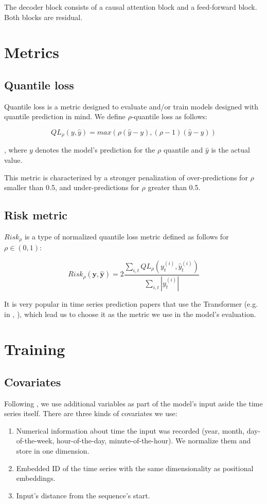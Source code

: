 \documentclass[en]{pracamgr}
\begin{document}
The decoder block consists of a causal attention block and a feed-forward block. Both blocks are residual.

\section{Metrics}

\subsection{Quantile loss}

Quantile loss is a metric designed to evaluate and/or train models designed with quantile prediction in mind.
We define $\rho$-quantile loss as follows:

$$ QL_\rho(y, \hat{y}) = max(\rho(\hat{y} - y), (\rho - 1)(\hat{y} - y))$$

, where $y$ denotes the model's prediction for the $\rho$ quantile and $\hat{y}$ is the actual value.

This metric is characterized by a stronger penalization of over-predictions for $\rho$ smaller than 0.5, and under-predictions for $\rho$ greater than 0.5.

\subsection{Risk metric}

$Risk_\rho$ is a type of normalized quantile loss metric defined as follows for $\rho \in (0,1)$:

$$ Risk_\rho(\textbf{y}, \hat{\textbf{y}}) 
= 2\frac{\sum_{i,t}QL_\rho(y^{(i)}_t,\hat{y}^{(i)}_t)}
{\sum_{i,t} |y^{(i)}_t|}$$


It is very popular in time series prediction papers that use the Transformer (e.g. in \cite{enhancing}, \cite{deepar}), which lead us to choose it as the metric we use in the model's evaluation.

\section{Training}

\subsection{Covariates}

Following \cite{enhancing}, we use additional variables as part of the model's input aside the time series itself.
There are three kinds of covariates we use:
\begin{enumerate}
	\item Numerical information about time the input was recorded (year, month, day-of-the-week, hour-of-the-day, minute-of-the-hour). We normalize them and store in one dimension.
	\item Embedded ID of the time series with the same dimensionality as positional embeddings.
	\item Input's distance from the sequence's start.
\end{enumerate}
\end{document}
